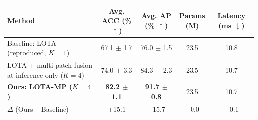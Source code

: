 \documentclass[8pt,a4paper]{article}
\newcommand{\BaseAcc}{67.1 $\pm$ 1.7}      %
\newcommand{\BaseAP}{76.0 $\pm$ 1.5}
\newcommand{\InfAcc}{74.0 $\pm$ 3.3}       %
\newcommand{\InfAP}{84.3 $\pm$ 2.3}
\newcommand{\OursAcc}{\textbf{82.2 $\pm$ 1.1}}      %
\newcommand{\OursAP}{\textbf{91.7 $\pm$ 0.8}}
\newcommand{\DeltaAcc}{+15.1}
\newcommand{\DeltaAP}{+15.7}
\newcommand{\Params}{23.5}       %
\newcommand{\BaseLat}{10.8}      %
\newcommand{\OursLat}{10.7}
\newcommand{\DeltaLat}{$-$0.1}
\begin{document}
\begin{center}


\label{tab:results}

\small

\begin{tabularx}{\linewidth}{
    @{}X c c c c@{}
}

\toprule

\textbf{Method}
&
\makecell{\textbf{Avg. ACC}\\(\% $\uparrow$)}
&
\makecell{\textbf{Avg. AP}\\(\% $\uparrow$)}
&
\makecell{\textbf{Params}\\(M)}
&
\makecell{\textbf{Latency}\\(ms $\downarrow$)}
\\

\midrule

Baseline: LOTA (reproduced, $K{=}1$)
&
\BaseAcc
&
\BaseAP
&
\Params
&
\BaseLat
\\

LOTA + multi-patch fusion at inference only ($K{=}4$)
&
\InfAcc
&
\InfAP
&
\Params
&
\OursLat
\\

\textbf{Ours: LOTA-MP ($K{=}4$)}
&
\OursAcc
&
\OursAP
&
\Params
&
\OursLat
\\

\midrule

$\Delta$ (Ours -- Baseline)
&
\DeltaAcc
&
\DeltaAP
&
+0.0
&
\DeltaLat
\\

\bottomrule

\end{tabularx}

\end{center}

\vspace{-5pt}
\end{document}
